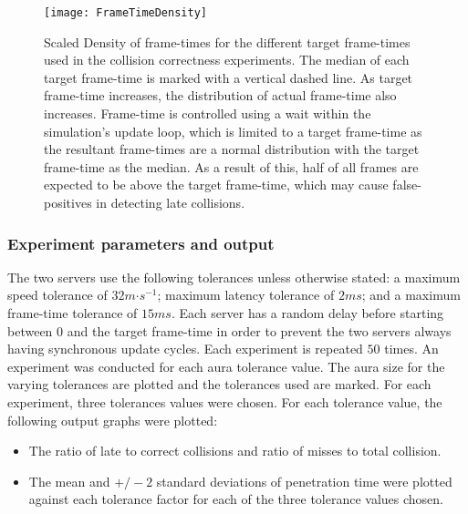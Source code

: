 \begin{figure}
	\centering
	\texttt{[image: FrameTimeDensity]}
	\caption{Scaled Density of frame-times for the different target frame-times used in the collision correctness experiments. The median of each target frame-time is marked with a vertical dashed line. As target frame-time increases, the distribution of actual frame-time also increases. Frame-time is controlled using a wait within the simulation's update loop, which is limited to a target frame-time as the resultant frame-times are a normal distribution with the target frame-time as the median. As a result of this, half of all frames are expected to be above the target frame-time, which may cause false-positives in detecting late collisions.}
	\label{fig_FrameTimeDensity}
\end{figure}



\subsubsection{Experiment parameters and output}
The two servers use the following tolerances unless otherwise stated: a maximum speed tolerance of $32m\mathord{\cdot}s^{-1}$; maximum latency tolerance of $2ms$; and a maximum frame-time tolerance of $15ms$. Each server has a random delay before starting between $0$ and the target frame-time in order to prevent the two servers always having synchronous update cycles. Each experiment is repeated $50$ times. An experiment was conducted for each aura tolerance value. The aura size for the varying tolerances are plotted and the tolerances used are marked. For each experiment, three tolerances values were chosen. For each tolerance value, the following output graphs were plotted:
\begin{itemize}
	\item The ratio of late to correct collisions and ratio of misses to total collision.
	\item The mean and $+/-2$ standard deviations of penetration time were plotted against each tolerance factor for each of the three tolerance values chosen.
\end{itemize}

